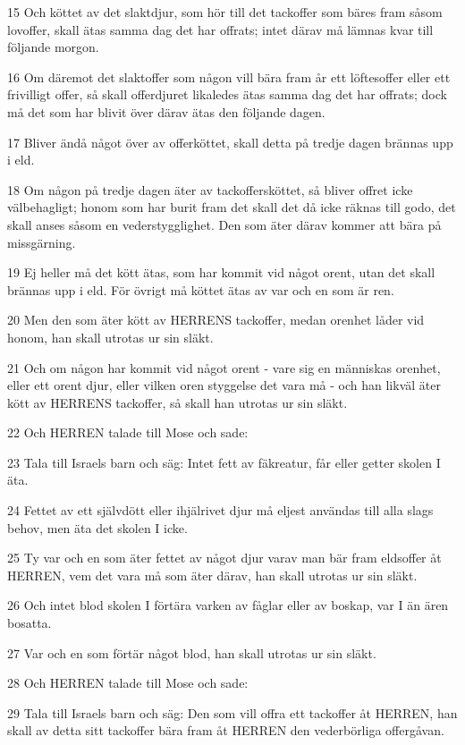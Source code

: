 \par 15 Och köttet av det slaktdjur, som hör till det tackoffer som bäres fram såsom lovoffer, skall ätas samma dag det har offrats; intet därav må lämnas kvar till följande morgon.
\par 16 Om däremot det slaktoffer som någon vill bära fram år ett löftesoffer eller ett frivilligt offer, så skall offerdjuret likaledes ätas samma dag det har offrats; dock må det som har blivit över därav ätas den följande dagen.
\par 17 Bliver ändå något över av offerköttet, skall detta på tredje dagen brännas upp i eld.
\par 18 Om någon på tredje dagen äter av tackoffersköttet, så bliver offret icke välbehagligt; honom som har burit fram det skall det då icke räknas till godo, det skall anses såsom en vederstygglighet. Den som äter därav kommer att bära på missgärning.
\par 19 Ej heller må det kött ätas, som har kommit vid något orent, utan det skall brännas upp i eld. För övrigt må köttet ätas av var och en som är ren.
\par 20 Men den som äter kött av HERRENS tackoffer, medan orenhet låder vid honom, han skall utrotas ur sin släkt.
\par 21 Och om någon har kommit vid något orent - vare sig en människas orenhet, eller ett orent djur, eller vilken oren styggelse det vara må - och han likväl äter kött av HERRENS tackoffer, så skall han utrotas ur sin släkt.
\par 22 Och HERREN talade till Mose och sade:
\par 23 Tala till Israels barn och säg: Intet fett av fäkreatur, får eller getter skolen I äta.
\par 24 Fettet av ett självdött eller ihjälrivet djur må eljest användas till alla slags behov, men äta det skolen I icke.
\par 25 Ty var och en som äter fettet av något djur varav man bär fram eldsoffer åt HERREN, vem det vara må som äter därav, han skall utrotas ur sin släkt.
\par 26 Och intet blod skolen I förtära varken av fåglar eller av boskap, var I än ären bosatta.
\par 27 Var och en som förtär något blod, han skall utrotas ur sin släkt.
\par 28 Och HERREN talade till Mose och sade:
\par 29 Tala till Israels barn och säg: Den som vill offra ett tackoffer åt HERREN, han skall av detta sitt tackoffer bära fram åt HERREN den vederbörliga offergåvan.
